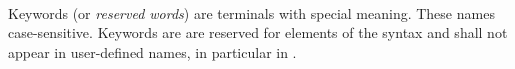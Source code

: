 
\begin{grammar}
\oneof \\
   
   
   
    
    
    
   
   
    
   
   
\end{grammar}

\specsubitem
Keywords (or \textit{reserved words}) are terminals with special meaning. These
names case-sensitive. Keywords are are reserved for elements of the syntax and
shall not appear in user-defined names, in particular in .
